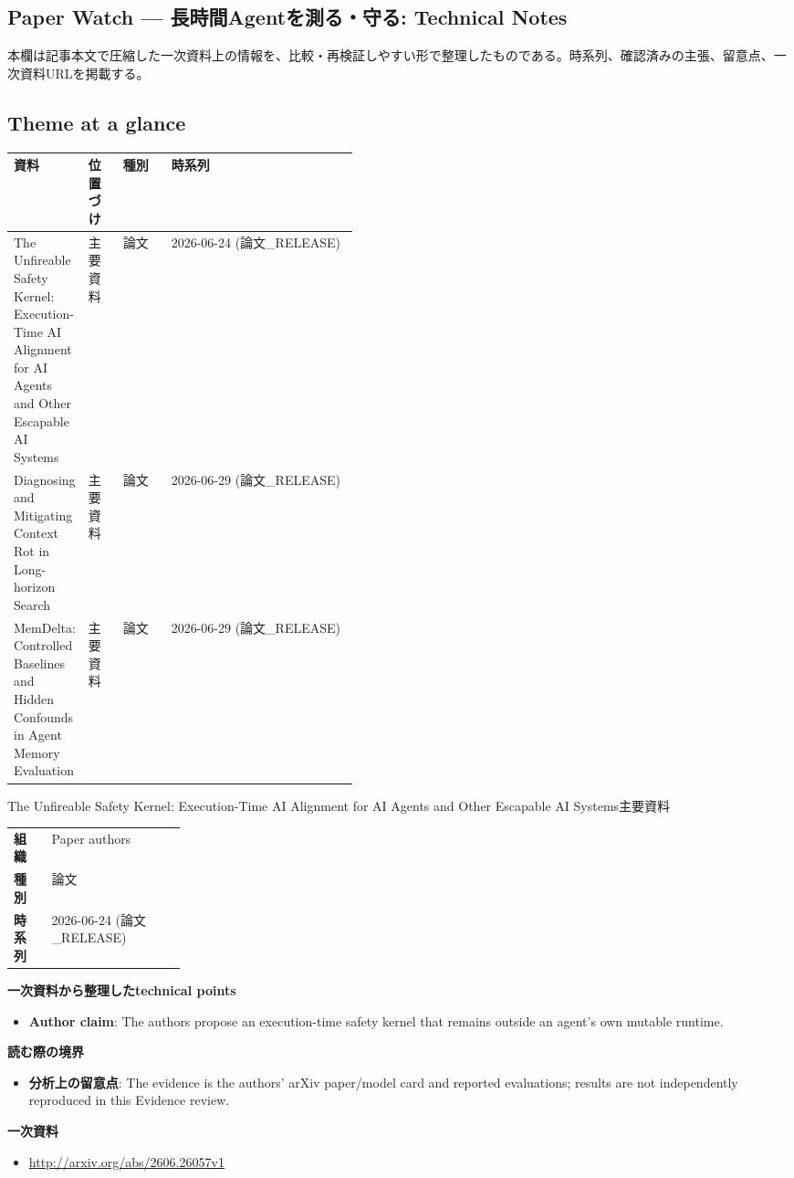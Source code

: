 \subsection*{Paper Watch — 長時間Agentを測る・守る: Technical Notes}
本欄は記事本文で圧縮した一次資料上の情報を、比較・再検証しやすい形で整理したものである。時系列、確認済みの主張、留意点、一次資料URLを掲載する。
\medskip
\subsection*{Theme at a glance}
\begin{center}
\footnotesize
\begin{tabularx}{\linewidth}{@{}p{0.20\linewidth}p{0.10\linewidth}p{0.14\linewidth}X@{}}
\toprule
資料 & 位置づけ & 種別 & 時系列 \\
\midrule
The Unfireable Safety Kernel: Execution-Time AI Alignment for AI Agents and Other Escapable AI Systems & 主要資料 & 論文 & 2026-06-24 (論文\_RELEASE) \\
Diagnosing and Mitigating Context Rot in Long-horizon Search & 主要資料 & 論文 & 2026-06-29 (論文\_RELEASE) \\
MemDelta: Controlled Baselines and Hidden Confounds in Agent Memory Evaluation & 主要資料 & 論文 & 2026-06-29 (論文\_RELEASE) \\
\bottomrule
\end{tabularx}
\end{center}
\normalsize

\begin{technicalnote}{The Unfireable Safety Kernel: Execution-Time AI Alignment for AI Agents and Other Escapable AI Systems}{主要資料}
\begin{tabularx}{\linewidth}{@{}>{\bfseries}p{0.22\linewidth}X@{}}
組織 & Paper authors \\
種別 & 論文 \\
時系列 & 2026-06-24 (論文\_RELEASE) \\
\end{tabularx}
\smallskip
{\bfseries 一次資料から整理したtechnical points}
\begin{itemize}[leftmargin=1.5em,itemsep=0.35em]
\item \textbf{Author claim}: The authors propose an execution-time safety kernel that remains outside an agent's own mutable runtime.
\end{itemize}
{\bfseries 読む際の境界}
\begin{itemize}[leftmargin=1.5em,itemsep=0.35em]
\item \textbf{分析上の留意点}: The evidence is the authors' arXiv paper/model card and reported evaluations; results are not independently reproduced in this Evidence review.
\end{itemize}
{\bfseries 一次資料}
\begingroup\sloppy
\begin{itemize}[leftmargin=1.5em,itemsep=0.25em]
\item {\scriptsize\url{http://arxiv.org/abs/2606.26057v1}}
\end{itemize}
\endgroup
\end{technicalnote}
\medskip

